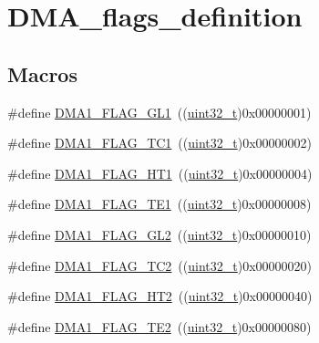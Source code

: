 \hypertarget{group___d_m_a__flags__definition}{}\section{D\+M\+A\+\_\+flags\+\_\+definition}
\label{group___d_m_a__flags__definition}
\subsection*{Macros}
\begin{DoxyCompactItemize}
\item 
\#define \hyperlink{group___d_m_a__flags__definition_gad1ac00f031065682ac125f6f9be061e6}{D\+M\+A1\+\_\+\+F\+L\+A\+G\+\_\+\+G\+L1}~((\hyperlink{_p_e___types_8h_a33594304e786b158f3fb30289278f5af}{uint32\+\_\+t})0x00000001)
\item 
\#define \hyperlink{group___d_m_a__flags__definition_gaa9b4d1112bcfd34136007b813a11187e}{D\+M\+A1\+\_\+\+F\+L\+A\+G\+\_\+\+T\+C1}~((\hyperlink{_p_e___types_8h_a33594304e786b158f3fb30289278f5af}{uint32\+\_\+t})0x00000002)
\item 
\#define \hyperlink{group___d_m_a__flags__definition_ga9c806b96cfdcebddb64f70d13ad32270}{D\+M\+A1\+\_\+\+F\+L\+A\+G\+\_\+\+H\+T1}~((\hyperlink{_p_e___types_8h_a33594304e786b158f3fb30289278f5af}{uint32\+\_\+t})0x00000004)
\item 
\#define \hyperlink{group___d_m_a__flags__definition_gae30157801ac1460dab86a8f54cfd3479}{D\+M\+A1\+\_\+\+F\+L\+A\+G\+\_\+\+T\+E1}~((\hyperlink{_p_e___types_8h_a33594304e786b158f3fb30289278f5af}{uint32\+\_\+t})0x00000008)
\item 
\#define \hyperlink{group___d_m_a__flags__definition_gad27b8a0cf554638d78fb67a010c0419b}{D\+M\+A1\+\_\+\+F\+L\+A\+G\+\_\+\+G\+L2}~((\hyperlink{_p_e___types_8h_a33594304e786b158f3fb30289278f5af}{uint32\+\_\+t})0x00000010)
\item 
\#define \hyperlink{group___d_m_a__flags__definition_ga0eff24f7e6b2b874328d531ee9315b20}{D\+M\+A1\+\_\+\+F\+L\+A\+G\+\_\+\+T\+C2}~((\hyperlink{_p_e___types_8h_a33594304e786b158f3fb30289278f5af}{uint32\+\_\+t})0x00000020)
\item 
\#define \hyperlink{group___d_m_a__flags__definition_gae154ffd90ebaec11f9ed1be00e69f149}{D\+M\+A1\+\_\+\+F\+L\+A\+G\+\_\+\+H\+T2}~((\hyperlink{_p_e___types_8h_a33594304e786b158f3fb30289278f5af}{uint32\+\_\+t})0x00000040)
\item 
\#define \hyperlink{group___d_m_a__flags__definition_ga23bfb917d32a8dd5a96d343ef5f6ea46}{D\+M\+A1\+\_\+\+F\+L\+A\+G\+\_\+\+T\+E2}~((\hyperlink{_p_e___types_8h_a33594304e786b158f3fb30289278f5af}{uint32\+\_\+t})0x00000080)

\end{DoxyCompactItemize}
